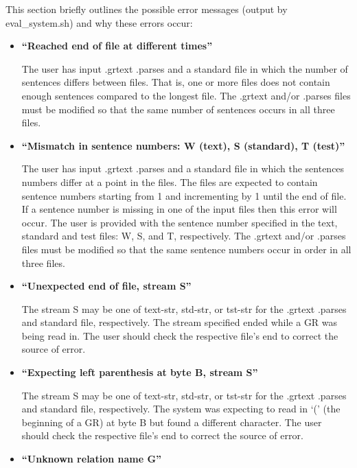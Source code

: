 \documentclass[10pt]{article}
\begin{document}
This section briefly outlines the possible error messages (output
by eval\_system.sh) and why these errors occur:
\begin{itemize}
\item{\bf ``Reached end of file at different times''}

The user has input .grtext .parses and
a standard file in which the number of sentences differs between
files. That is, one or more files does not contain enough sentences
compared to the longest file. The .grtext and/or .parses
files must be modified so that the same number of 
sentences occurs in all three files.

\item{\bf ``Mismatch in sentence numbers: W (text), S (standard), T (test)''}

The user has input .grtext .parses and
a standard file in which the sentences numbers differ at a 
point in the files. The files are expected to contain sentence
numbers starting from 1 and incrementing by 1 until the end of file.
If a sentence number is missing in one of the input files
then this error will occur. The user is provided with the sentence
number specified in the text, standard and test files: W, S, and T,
respectively. The .grtext and/or .parses files must be modified so
that the same sentence numbers occur in order in all three files.

\item{\bf ``Unexpected end of file, stream S''}

The stream S may be one of text-str, std-str, or tst-str
for the .grtext .parses and standard file, respectively.
The stream specified ended while a GR was being read in.
The user should check the respective file's end to correct
the source of error.


\item{\bf ``Expecting left parenthesis at byte B, stream S''}

The stream S may be one of text-str, std-str, or tst-str
for the .grtext .parses and standard file, respectively.
The system was expecting to read in `(' (the beginning of
a GR) at byte B but found a different character.
The user should check the respective file's end to correct
the source of error.

\item{\bf ``Unknown relation name G''}


\end{itemize}
\end{document}
